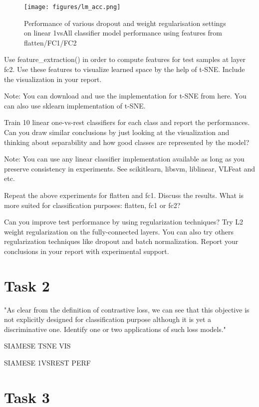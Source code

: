 \documentclass{article}
\begin{document}
\begin{figure}[h]
	\centering
	\texttt{[image: figures/lm\_acc.png]}
	\caption{Performance of various dropout and weight regularisation settings on linear 1vsAll classifier model performance using features from flatten/FC1/FC2}
	\label{fig:lms}
\end{figure}


Use feature\_extraction() in order to compute features for test samples at layer fc2. Use these features to visualize learned space by the help of t-SNE. Include the visualization in your report.

Note: You can download and use the implementation for t-SNE from here. You can also use sklearn implementation of t-SNE.

Train 10 linear one-vs-rest classifiers for each class and report the performances. Can you draw similar conclusions by just looking at the visualization and thinking about separability and how good classes are represented by the model?

Note: You can use any linear classifier implementation available as long as you preserve consistency in experiments. See scikitlearn, libsvm, liblinear, VLFeat and etc.

Repeat the above experiments for flatten and fc1. Discuss the results. What is more suited for classification purposes: flatten, fc1 or fc2?

Can you improve test performance by using regularization techniques? Try L2 weight regularization on the fully-connected layers. You can also try others regularization techniques like dropout and batch normalization. Report your conclusions in your report with experimental support.



\section{Task 2}

"As clear from the definition of contrastive loss, we can see that this objective is not explicitly designed for classification purpose although it is yet a discriminative one. Identify one or two applications of such loss models."

SIAMESE TSNE VIS

SIAMESE 1VSREST PERF

\section{Task 3}
\end{document}
